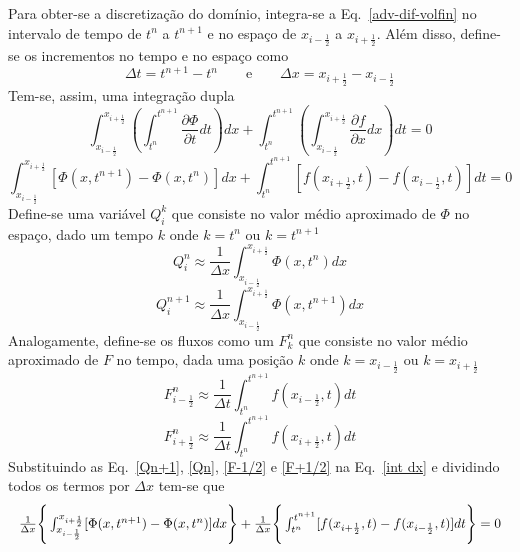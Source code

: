 Para obter-se a discretização do domínio, integra-se a Eq.\
\ref{adv-dif-volfin} no intervalo de tempo de $t^n$ a $t^{n+1}$ e no espaço de
$x_{i-\frac{1}{2}}$ a $x_{i+\frac{1}{2}}$. Além disso, define-se os incrementos
no tempo e no espaço como
\[
    \Delta t = t^{n+1} - t^n \qquad\text{e}\qquad \Delta x = x_{i+\frac{1}{2}}
    - x_{i-\frac{1}{2}}
\]
Tem-se, assim, uma integração dupla
\[
    \int_{x_{i-\frac{1}{2}}}^{x_{i+\frac{1}{2}}} \left( \int_{t^n}^{t^{n+1}}
    \frac{\partial \Phi}{\partial t}dt \right)dx
    +
    \int_{t^n}^{t^{n+1}} \left(\int_{x_{i-\frac{1}{2}}}^{x_{i+\frac{1}{2}}}
    \frac{\partial f}{\partial x}dx \right)dt
    = 0
\]
\begin{equation}\label{int dx}
    \int_{x_{i-\frac{1}{2}}}^{x_{i+\frac{1}{2}}}[\Phi(x,t^{n+1}) -
    \Phi(x,t^n)]dx
    +
    \int_{t^n}^{t^{n+1}} [f(x_{i+\frac{1}{2}},t) - f(x_{i-\frac{1}{2}},t)]dt
    = 0
\end{equation}
Define-se uma variável $Q_i^k$ que consiste no valor médio aproximado
de $\Phi$ no espaço, dado um tempo $k$ onde $k = t^n$ ou $k = t^{n+1}$
\begin{equation}\label{Qn+1}
    Q_i^n \approx \frac{1}{\Delta x}
    \int_{x_{i-\frac{1}{2}}}^{x_{i+\frac{1}{2}}} \Phi(x,t^n)dx
\end{equation}
\begin{equation}\label{Qn}
    Q_i^{n+1} \approx \frac{1}{\Delta x}
    \int_{x_{i-\frac{1}{2}}}^{x_{i+\frac{1}{2}}} \Phi(x,t^{n+1})dx
\end{equation}
Analogamente, define-se os fluxos como um $F_k^n$ que consiste no
valor médio aproximado de $F$ no tempo, dada uma posição $k$ onde $k =
x_{i-\frac{1}{2}}$ ou $k = x_{i+\frac{1}{2}}$
\begin{equation}\label{F-1/2}
    F_{i-\frac{1}{2}}^n \approx \frac{1}{\Delta t}
    \int_{t^n}^{t^{n+1}} f(x_{i-\frac{1}{2}},t)dt
\end{equation}
\begin{equation}\label{F+1/2}
    F_{i+\frac{1}{2}}^n \approx \frac{1}{\Delta t}
    \int_{t^n}^{t^{n+1}} f(x_{i+\frac{1}{2}},t)dt
\end{equation}
Substituindo as Eq.\ \ref{Qn+1}, \ref{Qn}, \ref{F-1/2} e \ref{F+1/2}
na Eq.\ \ref{int dx} e dividindo todos os termos por $\Delta x$ tem-se que
\[
    \resizebox{\textwidth}{!}
    {$
    \frac{1}{\Delta x} \Bigg\{
    \int_{x_{i-\frac{1}{2}}}^{x_{i+\frac{1}{2}}}[\Phi(x,t^{n+1}) -
    \Phi(x,t^n)]dx
    \Bigg\}
    +
    \frac{1}{\Delta x} \Bigg\{
    \int_{t^n}^{t^{n+1}} [f(x_{i+\frac{1}{2}},t) - f(x_{i-\frac{1}{2}},t)]dt
    \Bigg\}
    = 0
    $}
\]
